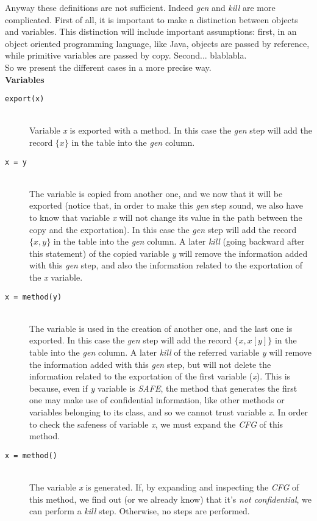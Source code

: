\documentclass[letterpaper,twocolumn,10pt]{article}
\begin{document}
Anyway these definitions are not sufficient. Indeed \emph{gen} and \emph{kill} are more complicated. First of all, it is important to make a distinction between objects and variables. This distinction will include important assumptions: first, in an object oriented programming language, like Java, objects are passed by reference, while primitive variables are passed by copy. Second... blablabla. \\
So we present the different cases in a more precise way.\\

\noindent \textbf{Variables}
\begin{description}

\item[\texttt{export(x)}] \hfill \\
Variable \emph{x} is exported with a method. In this case the \emph{gen} step will add the record $\{x\}$ in the table into the \emph{gen} column.

\item[\texttt{x = y}] \hfill \\
The variable is copied from another one, and we now that it will be exported (notice that, in order to make this \emph{gen} step sound, we also have to know that variable \emph{x} will not change its value in the path between the copy and the exportation). In this case the \emph{gen} step will add the record $\{x, y\}$ in the table into the \emph{gen} column. A later \emph{kill} (going backward after this statement) of the copied variable \emph{y} will remove the information added with this \emph{gen} step, and also the information related to the exportation of the \emph{x}  variable.

\item[\texttt{x = method(y)}] \hfill \\
The variable is used in the creation of another one, and the last one is exported. In this case the \emph{gen} step will add the record $\{x, x[y]\}$ in the table into the \emph{gen} column. A later \emph{kill} of the referred variable \emph{y} will remove the information added with this \emph{gen} step, but will not delete the information related to the exportation of the first variable (\emph{x}). This is because, even if \emph{y} variable is \emph{SAFE}, the method that generates the first one may make use of confidential information, like other methods or variables belonging to its class, and so we cannot trust variable \emph{x}. In order to check the safeness of variable \emph{x}, we must expand the \emph{CFG} of this method.

\item[\texttt{x = method()}] \hfill \\
The variable \emph{x} is generated. If, by expanding and inspecting the \emph{CFG} of this method, we find out (or we already know) that it's \emph{not confidential}, we can perform a \emph{kill} step. Otherwise, no steps are performed.

\end{description}
\end{document}
